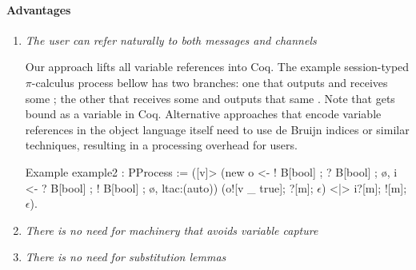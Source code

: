 \documentclass{mproj}
\newcommand{\picalc}{$\pi$-calculus}
\begin{document}

\paragraph{Advantages}
\begin{enumerate}
    \item \emph{The user can refer naturally to both messages and channels}

    Our approach lifts all variable references into Coq. The example session-typed \picalc{} process bellow has two branches: one that outputs  and receives some ; the other that receives some  and outputs that same . Note that  gets bound as a variable in Coq. Alternative approaches that encode variable references in the object language itself need to use de Bruijn indices \cite{deBruijn1972} or similar techniques, resulting in a processing overhead for users.
        
    \begin{coq}
    Example example2 : PProcess := ([v]>
        (new o <- ! B[bool] ; ? B[bool] ; ø,
             i <- ? B[bool] ; ! B[bool] ; ø,
             ltac:(auto))
        (o![v _ true]; ?[m]; $\epsilon$) <|> i?[m]; ![m]; $\epsilon$).
    \end{coq}

    \item \emph{There is no need for machinery that avoids variable capture}


    \item \emph{There is no need for substitution lemmas}

\end{enumerate}
\end{document}
